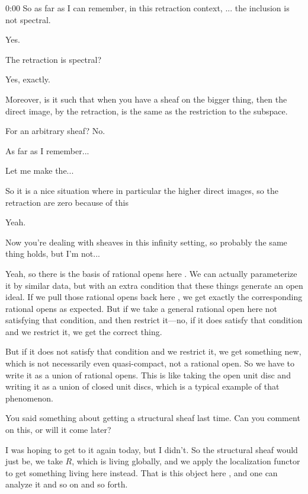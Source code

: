 \begin{unfinished}{0:00}
\gabber So as far as I can remember, in this retraction context, ... the inclusion is not spectral.

\ans Yes.

\gabber The retraction is spectral?

\ans Yes, exactly.

\gabber Moreover, is it such that when you have a sheaf on the bigger thing, then the direct image, by the retraction, is the same as the restriction to the subspace. 

\ans For an arbitrary sheaf? No.

\gabber As far as I remember...

\ans Let me  make the...

\gabber So it is a nice situation where in particular the higher direct images, so the retraction are zero because of this

\ans Yeah.

\gabber Now you're dealing with sheaves in this infinity setting, so probably the same thing holds, but I'm not...

\ans Yeah, so there is the basis of rational opens here . We can actually parameterize it by similar data, but with an extra condition that these things generate an open ideal. If we pull those rational opens back here , we get exactly the corresponding rational opens as expected. 
But if we take a general rational open here  not satisfying that condition, and then restrict it---no, if it does satisfy that condition and we restrict it, we get the correct thing. 

But if it does not satisfy that condition and we restrict it, we get something new, which is not necessarily even quasi-compact, not a rational open. So we have to write it as a union of rational opens. This is like taking the open unit disc and writing it as a union of closed unit discs, which is a typical example of that phenomenon.

\ques You said something about getting a structural sheaf last time. Can you comment on this, or will it come later? 

\ans I was hoping to get to it again today, but I didn't. So the structural sheaf would just be, we take $R$, which is living globally, and we apply the localization functor to get something living here  instead. That is this object here , and one can analyze it and so on and so forth. 


\end{unfinished}
